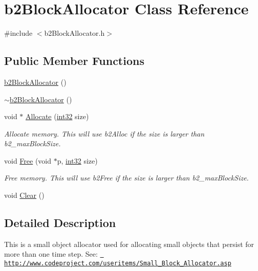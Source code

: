 \hypertarget{classb2_block_allocator}{}\section{b2\+Block\+Allocator Class Reference}
\label{classb2_block_allocator}


{\ttfamily \#include $<$b2\+Block\+Allocator.\+h$>$}

\subsection*{Public Member Functions}
\begin{DoxyCompactItemize}
\item 
\mbox{\hyperlink{classb2_block_allocator_aed5dab4fea4c2636724dac550105f8c1}{b2\+Block\+Allocator}} ()
\item 
\mbox{\hyperlink{classb2_block_allocator_a4179da8aa8fc463cd06adeab926e9c89}{$\sim$b2\+Block\+Allocator}} ()
\item 
void $\ast$ \mbox{\hyperlink{classb2_block_allocator_a437bf775c23f6e36af11a6d1653d7040}{Allocate}} (\mbox{\hyperlink{b2_settings_8h_a43d43196463bde49cb067f5c20ab8481}{int32}} size)
\begin{DoxyCompactList}\small\item\em Allocate memory. This will use b2\+Alloc if the size is larger than b2\+\_\+max\+Block\+Size. \end{DoxyCompactList}\item 
void \mbox{\hyperlink{classb2_block_allocator_a945fdf86e260318b930a53dcc887ca8b}{Free}} (void $\ast$p, \mbox{\hyperlink{b2_settings_8h_a43d43196463bde49cb067f5c20ab8481}{int32}} size)
\begin{DoxyCompactList}\small\item\em Free memory. This will use b2\+Free if the size is larger than b2\+\_\+max\+Block\+Size. \end{DoxyCompactList}\item 
void \mbox{\hyperlink{classb2_block_allocator_a3d3bac86217eba9d1eb6dff2acee0d77}{Clear}} ()
\end{DoxyCompactItemize}


\subsection{Detailed Description}
This is a small object allocator used for allocating small objects that persist for more than one time step. See\+: \href{http://www.codeproject.com/useritems/Small_Block_Allocator.asp}{\texttt{ http\+://www.\+codeproject.\+com/useritems/\+Small\+\_\+\+Block\+\_\+\+Allocator.\+asp}} 

